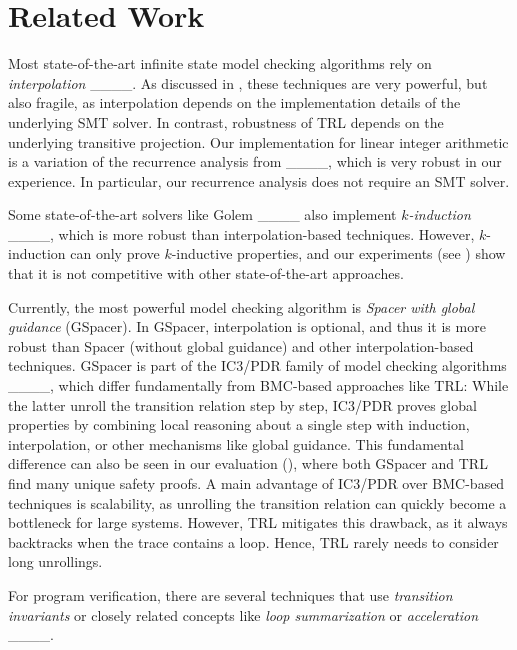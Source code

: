 \section{Related Work}
\label{sec:related}

Most state-of-the-art infinite state model checking algorithms rely on \emph{interpolation} ____.
%
As discussed in , these techniques are very powerful, but also fragile, as interpolation depends on the implementation details of the underlying SMT solver.
%
In contrast, robustness of TRL depends on the underlying transitive projection.
%
Our implementation for linear integer arithmetic is a variation of the recurrence analysis from ____, which is very robust in our experience.
%
In particular, our recurrence analysis does not require an SMT solver.

Some state-of-the-art solvers like \textsf{Golem} ____ also implement \emph{$k$-induction} ____, which is more robust than interpolation-based techniques.
%
However, $k$-induction can only prove $k$-inductive properties, and our experiments (see ) show that it is not competitive with other state-of-the-art approaches.

Currently, the most powerful model checking algorithm is \emph{Spacer with global guidance} (GSpacer).
%
In GSpacer, interpolation is optional, and thus it is more robust than Spacer (without global guidance) and other interpolation-based techniques.
%
GSpacer is part of the IC3/PDR family of model checking algorithms ____, which differ fundamentally from BMC-based approaches like TRL:
%
While the latter unroll the transition relation step by step, IC3/PDR proves global properties by combining local reasoning about a single step with induction, interpolation, or other mechanisms like global guidance.
%
This fundamental difference can also be seen in our evaluation (), where both GSpacer and TRL find many unique safety proofs.
%
A main advantage of IC3/PDR over BMC-based techniques is scalability, as unrolling the transition relation can quickly become a bottleneck for large systems.
%
However, TRL mitigates this drawback, as it always backtracks when the trace contains a loop.
%
Hence, TRL rarely needs to consider long unrollings.

For program verification, there are several techniques that use \emph{transition invariants} or closely related concepts like \emph{loop summarization} or \emph{acceleration} ____.

